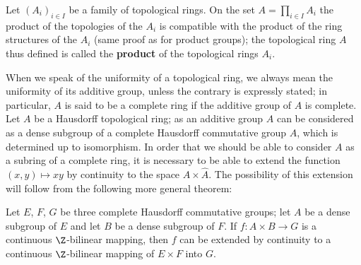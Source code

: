Let $(A_i)_{i\in I}$ be a family of topological rings. On the set $A=\prod_{i\in I}A_i$ the product of the topologies of the $A_i$ is compatible with the product of the ring structures of the $A_i$ (same proof as for product groups); the topological ring $A$ thus defined is called the \textbf{product} of the topological rings $A_i$.\par
When we speak of the uniformity of a topological ring, we always mean the uniformity of its additive group, unless the contrary is expressly stated; in particular, $A$ is said to be a complete ring if the additive group of $A$ is complete. Let $A$ be a Hausdorff topological ring; as an additive group $A$ can be considered as a dense subgroup of a complete Hausdorff commutative group $A$, which is determined up to isomorphism. In order that we should be able to consider $A$ as a subring of a complete ring, it is necessary to be able to extend the function $(x,y)\mapsto xy$ by continuity to the space $\widehat{A}\times\widehat{A}$. The possibility of this extension will follow from the following more general theorem:
\begin{theorem}\label{topological ring Z-bilinear map extension}
Let $E$, $F$, $G$ be three complete Hausdorff commutative groups; let $A$ be a dense subgroup of $E$ and let $B$ be a dense subgroup of $F$. If $f:A\times B\to G$ is a continuous $\Z$-bilinear mapping, then $f$ can be extended by continuity to a continuous $\Z$-bilinear mapping of $E\times F$ into $G$.
\end{theorem}
